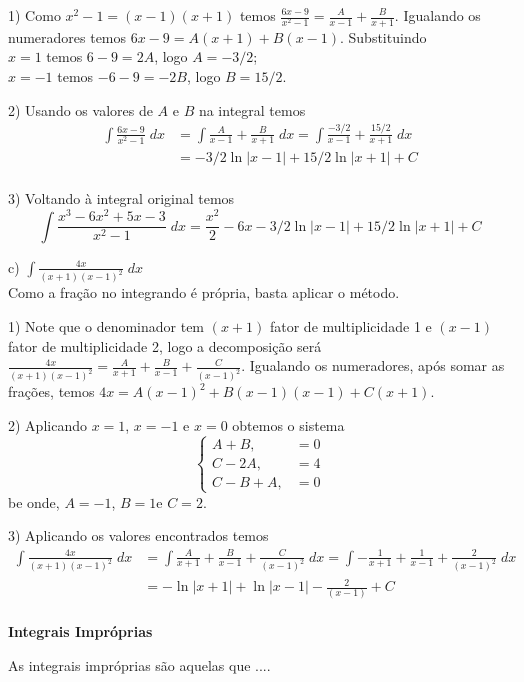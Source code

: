 \documentclass[11pt]{article}
\begin{document}
1) Como $x^2-1 =(x-1)(x+1)$ temos $\displaystyle \frac{6x-9}{x^2-1}= \frac{A}{x-1}+\frac{B}{x+1}$. Igualando os numeradores temos $6x-9= A(x+1)+B(x-1)$.  Substituindo\\
$x=1$ temos $6-9=2A$, logo $A=-3/2$;\\
$x=-1$ temos $-6-9=-2B$, logo $B=15/2$.

2) Usando os valores de $A$ e $B$ na integral temos
\begin{align*}
  \int \frac{6x-9}{x^2-1}\;dx &= \int \frac{A}{x-1}+\frac{B}{x+1}\;dx = \int \frac{-3/2}{x-1}+\frac{15/2}{x+1}\;dx \\
    &= -3/2 \ln|x-1|+15/2\ln|x+1|+C \\
\end{align*}

3) Voltando à integral original temos
$$\int\frac{x^3-6x^2+5x-3}{x^2-1}\;dx =\frac{x^2}{2}- 6x  -3/2 \ln|x-1|+15/2\ln|x+1|+C$$


c) $\displaystyle\int\frac{4x}{(x+1)(x-1)^2}\;dx$\\

Como a fração no integrando é própria, basta aplicar o método.

1) Note que o denominador tem $(x+1)$ fator de multiplicidade 1 e $(x-1)$ fator de multiplicidade 2, logo a decomposição será
$\displaystyle \frac{4x}{(x+1)(x-1)^2} = \frac{A}{x+1}+\frac{B}{x-1}+\frac{C}{(x-1)^2}$. Igualando os numeradores, após somar as frações, temos $4x= A(x-1)^2 + B(x-1)(x-1)+C (x+1)$.  

2) Aplicando $x=1$, $x=-1$ e $x=0$ obtemos o sistema
$$\left\{
    \begin{array}{ll}
      A+B, &=0 \\
      C-2A, & =4 \\
      C-B+A, & =0
    \end{array}
  \right.
$$
be onde, $A=-1$, $B=1$e $C=2$. 

3) Aplicando os valores encontrados temos
\begin{align*}
  \int \frac{4x}{(x+1)(x-1)^2} \;dx &= \int \frac{A}{x+1}+\frac{B}{x-1}+\frac{C}{(x-1)^2}\;dx = \int -\frac{1}{x+1}+\frac{1}{x-1}+\frac{2}{(x-1)^2}\;dx \\
    &= -  \ln|x+1|+ \ln|x-1|-\frac{2}{(x-1)}+ C \\
\end{align*}

\newpage
\noindent
    \begin{center}
    {\Large{\bf Integrais Impróprias}}
    \end{center}
\vspace{.5cm}
As integrais impróprias são aquelas que ....
\end{document}
